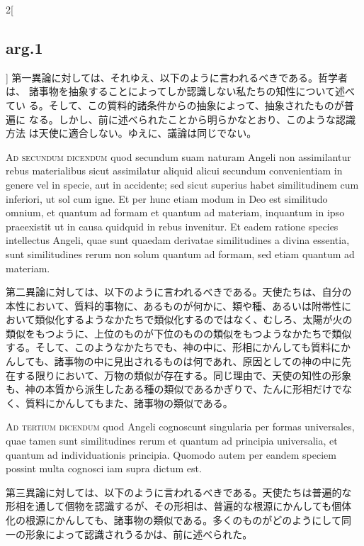 \documentclass[paper=a4paper,fontsize=10pt,jafontsize=9pt,titlepage]{jlreq}
\begin{document}
\begin{paracol}{2}[\subsection{arg.1}]
第一異論に対しては、それゆえ、以下のように言われるべきである。哲学者は、
諸事物を抽象することによってしか認識しない私たちの知性について述べてい
る。そして、この質料的諸条件からの抽象によって、抽象されたものが普遍に
なる。しかし、前に述べられたことから明らかなとおり、このような認識方法
は天使に適合しない。ゆえに、議論は同じでない。

\switchcolumn*[\subsection{ad.2}]

{\scshape Ad secundum dicendum} quod secundum suam naturam Angeli non
assimilantur rebus materialibus sicut assimilatur aliquid alicui
secundum convenientiam in genere vel in specie, aut in accidente; sed
sicut superius habet similitudinem cum inferiori, ut sol cum igne. Et
per hunc etiam modum in Deo est similitudo omnium, et quantum ad
formam et quantum ad materiam, inquantum in ipso praeexistit ut in
causa quidquid in rebus invenitur. Et eadem ratione species
intellectus Angeli, quae sunt quaedam derivatae similitudines a divina
essentia, sunt similitudines rerum non solum quantum ad formam, sed
etiam quantum ad materiam.

\switchcolumn

第二異論に対しては、以下のように言われるべきである。天使たちは、自分の
本性において、質料的事物に、あるものが何かに、類や種、あるいは附帯性に
おいて類似化するようなかたちで類似化するのではなく、むしろ、太陽が火の
類似をもつように、上位のものが下位のものの類似をもつようなかたちで類似
する。そして、このようなかたちでも、神の中に、形相にかんしても質料にか
んしても、諸事物の中に見出されるものは何であれ、原因としての神の中に先
在する限りにおいて、万物の類似が存在する。同じ理由で、天使の知性の形象
も、神の本質から派生したある種の類似であるかぎりで、たんに形相だけでな
く、質料にかんしてもまた、諸事物の類似である。

\switchcolumn*[\subsection{ad.3}]

{\scshape Ad tertium dicendum} quod Angeli cognoscunt singularia per
formas universales, quae tamen sunt similitudines rerum et quantum ad
principia universalia, et quantum ad individuationis
principia. Quomodo autem per eandem speciem possint multa cognosci iam
supra dictum est.

\switchcolumn

第三異論に対しては、以下のように言われるべきである。天使たちは普遍的な
形相を通して個物を認識するが、その形相は、普遍的な根源にかんしても個体
化の根源にかんしても、諸事物の類似である。多くのものがどのようにして同
一の形象によって認識されうるかは、前に述べられた。


\

\end{paracol}
\newpage
{}
{}
\setcounter{section}{3}
\setcounter{subsection}{0}
\end{document}
